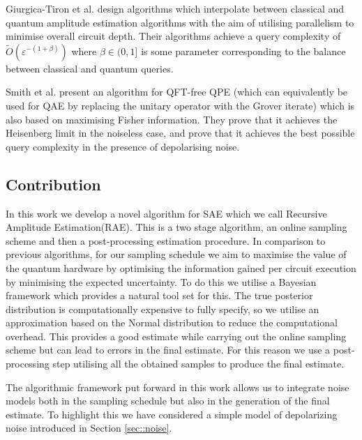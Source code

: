 Giurgica-Tiron et al. \cite{giurgica_2022_low_depth_for_qae} design algorithms which interpolate between classical and quantum amplitude estimation algorithms with the aim of utilising parallelism to minimise overall circuit depth. Their algorithms achieve a query complexity of $ \tilde{O} \left( \varepsilon^{-(1 + \beta)} \right) $ where $\beta \in (0,1]$ is some parameter corresponding to the balance between classical and quantum queries.

Smith et al. \cite{smith_2023_adaptive_bayesian_qae} present an algorithm for QFT-free QPE (which can equivalently be used for QAE by replacing the unitary operator with the Grover iterate) which is also based on maximising Fisher information. They prove that it achieves the Heisenberg limit in the noiseless case, and prove that it achieves the best possible query complexity in the presence of depolarising noise.



\subsection{Contribution}
In this work we develop a novel algorithm for SAE which we call Recursive Amplitude Estimation(RAE). This is a two stage algorithm, an online sampling scheme and then a post-processing estimation procedure. In comparison to previous algorithms, for our sampling schedule we aim to maximise the value of the quantum hardware by optimising the information gained per circuit execution by minimising the expected uncertainty. To do this we utilise a Bayesian framework which provides a natural tool set for this. The true posterior distribution is computationally expensive to fully specify, so we utilise an approximation based on the Normal distribution to reduce the computational overhead.  This provides a good estimate while carrying out the online sampling scheme but can lead to errors in the final estimate. For this reason we use a post-processing step utilising all the obtained samples to produce the final estimate.

The algorithmic framework put forward in this work allows us to integrate noise models both in the sampling schedule but also in the generation of the final estimate. To highlight this we have considered a simple model of  depolarizing noise introduced in Section \ref{sec::noise}.

